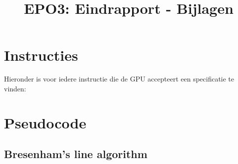 \documentclass{scrartcl}
\author{}
\title{EPO3: Eindrapport - Bijlagen}
\begin{document}
\renewcommand{\chapternumber}{\appendixname\;\thechapter}
\begin{appendices}

\chapter{Instructies}
\label{app:instructies}
Hieronder is voor iedere instructie die de GPU accepteert een specificatie te vinden:

\chapter{Pseudocode}
\label{app:pseudocode}
\section{Bresenham's line algorithm}
\label{appsec:pseudocode-bresenham-line}

\end{appendices}
\end{document}
